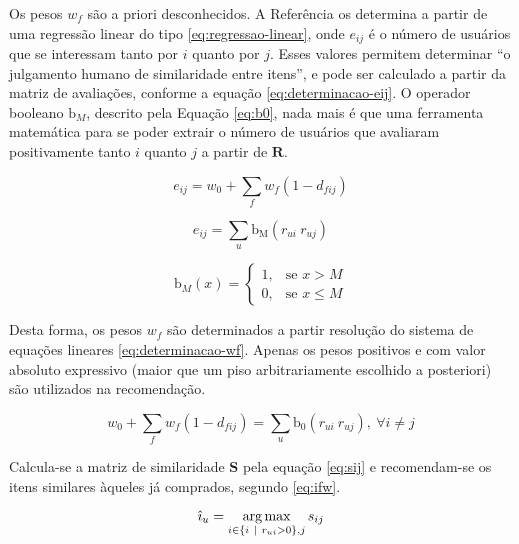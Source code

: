 Os pesos $w_f$ são a priori desconhecidos. A Referência  os determina a partir de uma regressão linear do tipo \ref{eq:regressao-linear}, onde $e_{ij}$ é o número de usuários que se interessam tanto por $i$ quanto por $j$. Esses valores permitem determinar ``o julgamento humano de similaridade entre itens'', e pode ser calculado a partir da matriz de avaliações, conforme a equação \ref{eq:determinacao-eij}. O operador booleano $\mathrm{b}_M$, descrito pela Equação \ref{eq:b0}, nada mais é que uma ferramenta matemática para se poder extrair o número de usuários que avaliaram positivamente tanto $i$ quanto $j$ a partir de $\mathbf{R}$. 

\begin{equation}
\label{eq:regressao-linear} 
    e_{ij} = w_0 + \sum_{f}{w_{f} \left(1-d_{fij}\right)}
\end{equation} 


\begin{equation}
\label{eq:determinacao-eij} 
    e_{ij} = \sum_{u}{\mathrm{b_M}\left(r_{ui} ~ r_{uj}\right)}
\end{equation} 

\begin{equation}
\label{eq:b0}
\mathrm{b}_M\left(x\right) = 
\begin{cases}
1, &\text{se }x>M \\
0, &\text{se }x\leq M
\end{cases} 
\end{equation}

Desta forma, os pesos $w_f$ são determinados a partir resolução do sistema de equações lineares \ref{eq:determinacao-wf}. Apenas os pesos positivos e com valor absoluto expressivo (maior que um piso arbitrariamente escolhido a posteriori) são utilizados na recomendação. 

\begin{equation}
\label{eq:determinacao-wf} 
    w_0 + \sum_{f}{w_{f}  \left(1-d_{fij}\right)} = \sum_{u}{\mathrm{b_0}\left(r_{ui} ~ r_{uj}\right)},~\forall i \neq j 
\end{equation} 

Calcula-se a matriz de similaridade $\mathbf{S}$ pela equação \ref{eq:sij} e recomendam-se os itens similares àqueles já comprados, segundo \ref{eq:ifw}.

\begin{equation}
\label{eq:ifw} 
    \hat{\imath}_u = \operatorname*{arg\,max}_{i \in \left\{i~|~r_{ui} > 0\right\}, j}{s_{ij}}
\end{equation} 

